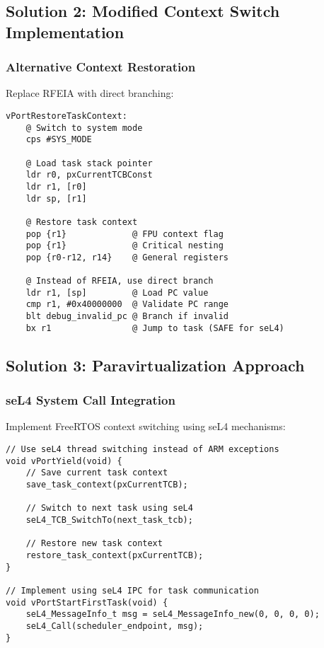 \documentclass[11pt,a4paper]{article}
\begin{document}
\subsection{Solution 2: Modified Context Switch Implementation}

\subsubsection{Alternative Context Restoration}

Replace RFEIA with direct branching:

\begin{lstlisting}[language=ARM,caption={seL4-Compatible Context Switch}]
vPortRestoreTaskContext:
    @ Switch to system mode
    cps #SYS_MODE
    
    @ Load task stack pointer
    ldr r0, pxCurrentTCBConst
    ldr r1, [r0]
    ldr sp, [r1]
    
    @ Restore task context
    pop {r1}             @ FPU context flag
    pop {r1}             @ Critical nesting
    pop {r0-r12, r14}    @ General registers
    
    @ Instead of RFEIA, use direct branch
    ldr r1, [sp]         @ Load PC value
    cmp r1, #0x40000000  @ Validate PC range
    blt debug_invalid_pc @ Branch if invalid
    bx r1                @ Jump to task (SAFE for seL4)
\end{lstlisting}

\subsection{Solution 3: Paravirtualization Approach}

\subsubsection{seL4 System Call Integration}

Implement FreeRTOS context switching using seL4 mechanisms:

\begin{lstlisting}[caption={Paravirtualized Task Switching}]
// Use seL4 thread switching instead of ARM exceptions
void vPortYield(void) {
    // Save current task context
    save_task_context(pxCurrentTCB);
    
    // Switch to next task using seL4
    seL4_TCB_SwitchTo(next_task_tcb);
    
    // Restore new task context
    restore_task_context(pxCurrentTCB);
}

// Implement using seL4 IPC for task communication
void vPortStartFirstTask(void) {
    seL4_MessageInfo_t msg = seL4_MessageInfo_new(0, 0, 0, 0);
    seL4_Call(scheduler_endpoint, msg);
}
\end{lstlisting}
\end{document}
